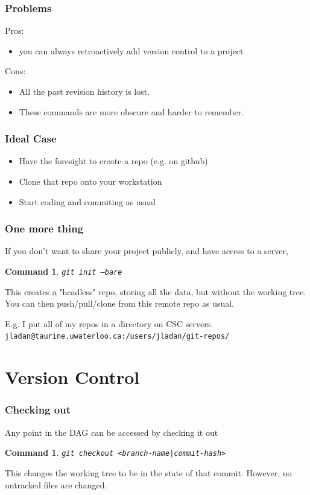 \documentclass{beamer}
\newtheorem{command}[theorem]{Command}
\begin{document}
\begin{frame}
    \frametitle{Problems}
    Pros:
    \begin{itemize}
        \item you can always retroactively add version control to a project
    \end{itemize}
    Cons:
    \begin{itemize}
        \item All the past revision history is lost.
        \item These commands are more obscure and harder to remember.
    \end{itemize}
\end{frame}

\begin{frame}
    \frametitle{Ideal Case}
    \begin{itemize}
        \item Have the foresight to create a repo (e.g. on github)
        \item Clone that repo onto your workstation
        \item Start coding and commiting as usual
    \end{itemize}
\end{frame}


\begin{frame}
    \frametitle{One more thing}
    If you don't want to share your project publicly, and have access to a server,
    \begin{command}
        \texttt{git init --bare}
    \end{command}
    This creates a "headless" repo, storing all the data, but without the working tree. You can then push/pull/clone from this remote repo as usual.
    \pause

    E.g. I put all of my repos in a directory on CSC servers. \texttt{jladan@taurine.uwaterloo.ca:/users/jladan/git-repos/}
\end{frame}

\section{Version Control}


\begin{frame}
    \frametitle{Checking out}
    Any point in the DAG can be accessed by checking it out
    \begin{command}
        \texttt{git checkout <branch-name|commit-hash>}
    \end{command}
    This changes the working tree to be in the state of that commit. However, no untracked files are changed.
\end{frame}
\end{document}
